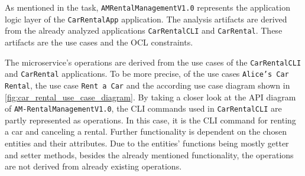 As mentioned in the task, \texttt{AMRentalManagementV1.0} represents the application logic layer of the \texttt{CarRentalApp} application.
The analysis artifacts are derived from the already analyzed applications \texttt{CarRentalCLI} and \texttt{CarRental}.
These artifacts are the use cases and the OCL constraints.

The microservice's operations are derived from the use cases of the \texttt{CarRentalCLI} and \texttt{CarRental} applications.
To be more precise, of the use cases \texttt{Alice's Car Rental}, the use case \texttt{Rent a Car} and the according use case diagram shown in \autoref*{fig:car_rental_use_case_diagram}.
By taking a closer look at the API diagram of \texttt{AM-RentalManagementV1.0}, the CLI commands used in \texttt{CarRentalCLI} are partly represented as operations.
In this case, it is the CLI command for renting a car and canceling a rental.
Further functionality is dependent on the chosen entities and their attributes.
Due to the entities' functions being mostly getter and setter methods, besides the already mentioned functionality, the operations are not derived from already existing operations.